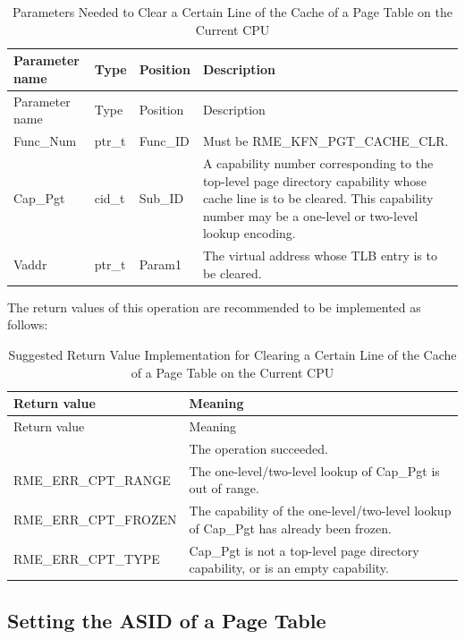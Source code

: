 \begin{xltabular}{\textwidth}{@{}>{\hsize\raggedright\arraybackslash}X>{\hsize\raggedright\arraybackslash}X>{\hsize\raggedright\arraybackslash}X>{\hsize\raggedright\arraybackslash}X@{}}
\caption{Parameters Needed to Clear a Certain Line of the Cache of a Page Table on the Current CPU}\label{tab:8-7-clear-page-table-cache-line-parameters}\\
\toprule
Parameter name & Type & Position & Description\tabularnewline
\endfirsthead
\toprule
Parameter name & Type & Position & Description\tabularnewline
\midrule
\endhead
\bottomrule
\endlastfoot
Func\_Num & ptr\_t & Func\_ID & Must be RME\_KFN\_PGT\_CACHE\_CLR.\tabularnewline
Cap\_Pgt & cid\_t & Sub\_ID &
A capability number corresponding to the top-level page directory capability whose cache line is to be cleared. This capability number may be a one-level or two-level lookup encoding.\tabularnewline
Vaddr & ptr\_t & Param1 & The virtual address whose TLB entry is to be cleared.\tabularnewline
\end{xltabular}
\nopagebreak[4]

The return values of this operation are recommended to be implemented as follows:

\begin{xltabular}{\textwidth}{@{}>{\hsize\raggedright\arraybackslash}X>{\hsize\raggedright\arraybackslash}X@{}}
\caption{Suggested Return Value Implementation for Clearing a Certain Line of the Cache of a Page Table on the Current CPU}\label{tab:8-8-clear-page-table-cache-line-suggested-return-values}\\
\toprule
Return value & Meaning\tabularnewline
\endfirsthead
\toprule
Return value & Meaning\tabularnewline
\midrule
\endhead
\bottomrule
{} & The operation succeeded.\tabularnewline
    RME\_ERR\_CPT\_RANGE & The one-level/two-level lookup of Cap\_Pgt is out of range.\tabularnewline
    RME\_ERR\_CPT\_FROZEN & The capability of the one-level/two-level lookup of Cap\_Pgt has already been frozen.\tabularnewline
    RME\_ERR\_CPT\_TYPE & Cap\_Pgt is not a top-level page directory capability, or is an empty capability.\tabularnewline
\end{xltabular}
\nopagebreak[4]

\subsection{Setting the ASID of a Page Table}\label{subsec:8-set-page-table-asid}

